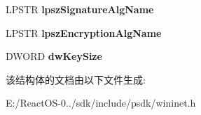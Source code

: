 \begin{DoxyCompactItemize}
L\+P\+S\+TR {\bfseries lpsz\+Signature\+Alg\+Name}
\item 
\mbox{\label{struct_i_n_t_e_r_n_e_t___c_e_r_t_i_f_i_c_a_t_e___i_n_f_o_a_a5720ae9c7c462a2d87788fea2933744b}} 
L\+P\+S\+TR {\bfseries lpsz\+Encryption\+Alg\+Name}
\item 
\mbox{\label{struct_i_n_t_e_r_n_e_t___c_e_r_t_i_f_i_c_a_t_e___i_n_f_o_a_a86bc41067c2464c5f45ce0c083462844}} 
D\+W\+O\+RD {\bfseries dw\+Key\+Size}
\end{DoxyCompactItemize}


该结构体的文档由以下文件生成\+:\begin{DoxyCompactItemize}
\item 
E\+:/\+React\+O\+S-\/0../sdk/include/psdk/wininet.\+h\end{DoxyCompactItemize}
